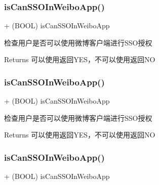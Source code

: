 \subsubsection{\texorpdfstring{is\+Can\+S\+S\+O\+In\+Weibo\+App()}{isCanSSOInWeiboApp()}\hspace{0.1cm}{\footnotesize\ttfamily [1/3]}}
{\footnotesize\ttfamily + (B\+O\+OL) is\+Can\+S\+S\+O\+In\+Weibo\+App \begin{DoxyParamCaption}{ }\end{DoxyParamCaption}}

检查用户是否可以使用微博客户端进行\+S\+S\+O授权 \begin{DoxyReturn}{Returns}
可以使用返回\+Y\+E\+S，不可以使用返回\+NO 
\end{DoxyReturn}
\mbox{\label{interface_weibo_s_d_k_adc233f097b5c5e0d99ebc326ffd2548a}} 
\subsubsection{\texorpdfstring{is\+Can\+S\+S\+O\+In\+Weibo\+App()}{isCanSSOInWeiboApp()}\hspace{0.1cm}{\footnotesize\ttfamily [2/3]}}
{\footnotesize\ttfamily + (B\+O\+OL) is\+Can\+S\+S\+O\+In\+Weibo\+App \begin{DoxyParamCaption}{ }\end{DoxyParamCaption}}

检查用户是否可以使用微博客户端进行\+S\+S\+O授权 \begin{DoxyReturn}{Returns}
可以使用返回\+Y\+E\+S，不可以使用返回\+NO 
\end{DoxyReturn}
\mbox{\label{interface_weibo_s_d_k_adc233f097b5c5e0d99ebc326ffd2548a}} 
\subsubsection{\texorpdfstring{is\+Can\+S\+S\+O\+In\+Weibo\+App()}{isCanSSOInWeiboApp()}\hspace{0.1cm}{\footnotesize\ttfamily [3/3]}}
{\footnotesize\ttfamily + (B\+O\+OL) is\+Can\+S\+S\+O\+In\+Weibo\+App \begin{DoxyParamCaption}{ }\end{DoxyParamCaption}}

